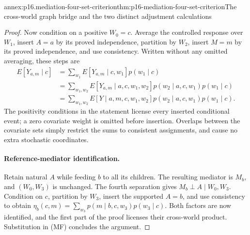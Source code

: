 \begin{annexitem}{annex:p16.mediation-four-set-criterion}{thm:p16-mediation-four-set-criterion}{The cross-world graph bridge and the two distinct adjustment calculations}
\begin{proof}
Now condition on a positive \(W_0=c\). Average the controlled response
over \(W_1\), insert \(A=a\) by its proved independence, partition
by \(W_2\), insert \(M=m\) by its proved independence, and use
consistency. Written without any omitted averaging, these steps are
\[
\begin{aligned}
 E[Y_{a,m}\mid c]
 &=\sum_{w_1}E[Y_{a,m}\mid c,w_1]p(w_1\mid c)\\
 &=\sum_{w_1,w_2}E[Y_{a,m}\mid a,c,w_1,w_2]
                           p(w_2\mid a,c,w_1)p(w_1\mid c)\\
 &=\sum_{w_1,w_2}E[Y\mid a,m,c,w_1,w_2]
                           p(w_2\mid a,c,w_1)p(w_1\mid c).
\end{aligned}
\]
The positivity conditions in the statement license every inserted
conditional event; a zero covariate weight is omitted before insertion.
Overlaps between the covariate sets simply restrict the sums to consistent
assignments, and cause no extra stochastic coordinates.

\paragraph{Reference-mediator identification.}
Retain natural \(A\) while feeding \(b\) to all its children. The
resulting mediator is \(M_b\), and \((W_0,W_3)\) is unchanged.
The fourth separation gives \(M_b\perp A\mid W_0,W_3\).
Condition on \(c\), partition by \(W_3\), insert the supported
\(A=b\), and use consistency to obtain
\(\eta_b(c,m)=\sum_{w_3}p(m\mid b,c,w_3)p(w_3\mid c)\).
Both factors are now identified, and the first part of the proof licenses
their cross-world product. Substitution in (MF) concludes the argument.
\end{proof}
\end{annexitem}


